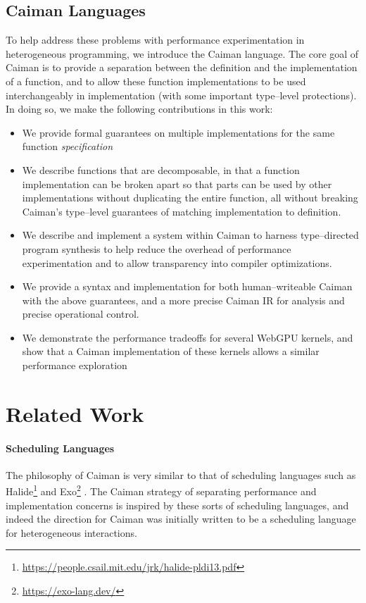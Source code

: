 \subsection{Caiman Languages}

To help address these problems with performance experimentation in heterogeneous programming, we introduce the Caiman language.  The core goal of Caiman is to provide a separation between the definition and the implementation of a function, and to allow these function implementations to be used interchangeably in implementation (with some important type--level protections).  In doing so, we make the following contributions in this work:
\begin{itemize}
\item We provide formal guarantees on multiple implementations for the same function \emph{specification}
\item We describe functions that are decomposable, in that a function implementation can be broken apart so that parts can be used by other implementations without duplicating the entire function, all without breaking Caiman's type--level guarantees of matching implementation to definition.
\item We describe and implement a system within Caiman to harness type--directed program synthesis to help reduce the overhead of performance experimentation and to allow transparency into compiler optimizations.
\item We provide a syntax and implementation for both human--writeable Caiman with the above guarantees, and a more precise Caiman IR for analysis and precise operational control.
\item We demonstrate the performance tradeoffs for several WebGPU kernels, and show that a Caiman implementation of these kernels allows a similar performance exploration 
\end{itemize}

\section{Related Work}

\paragraph{Scheduling Languages}

The philosophy of Caiman is very similar to that of scheduling languages such as Halide\footnote{\url{https://people.csail.mit.edu/jrk/halide-pldi13.pdf}} and Exo\footnote{\url{https://exo-lang.dev/}} .  The Caiman strategy of separating performance and implementation concerns is inspired by these sorts of scheduling languages, and indeed the direction for Caiman was initially written to be a scheduling language for heterogeneous interactions.  

